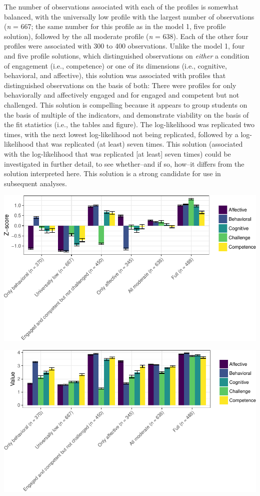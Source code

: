 \documentclass[]{book}
\theoremstyle{definition}
\theoremstyle{definition}
\theoremstyle{definition}
\theoremstyle{remark}
\begin{document}
The number of observations associated with each of the profiles is
somewhat balanced, with the universally low profile with the largest
number of observations (\emph{n} = 667; the same number for this profile
as in the model 1, five profile solution), followed by the all moderate
profile (\emph{n} = 638). Each of the other four profiles were
associated with 300 to 400 observations. Unlike the model 1, four and
five profile solutions, which distinguished observations on
\emph{either} a condition of engagement (i.e., competence) or one of its
dimensions (i.e., cognitive, behavioral, and affective), this solution
was associated with profiles that distinguished observations on the
basis of both: There were profiles for only behaviorally and affectively
engaged and for engaged and competent but not challenged. This solution
is compelling because it appears to group students on the basis of
multiple of the indicators, and demonstrate viability on the basis of
the fit statistics (i.e., the tables and figure). The log-likelihood was
replicated two times, with the next lowest log-likelihood not being
replicated, followed by a log-likelihood that was replicated (at least)
seven times. This solution (associated with the log-likelihood that was
replicated {[}at least{]} seven times) could be investigated in further
detail, to see whether--and if so, how--it differs from the solution
interpreted here. This solution is a strong candidate for use in
subsequent analyses.

\begin{center}\includegraphics[width=0.95\linewidth]{rosenberg-dissertation_files/figure-latex/m1_6p-1} \end{center}

\begin{center}\includegraphics[width=0.95\linewidth]{rosenberg-dissertation_files/figure-latex/m1_6p-2} \end{center}
\end{document}
